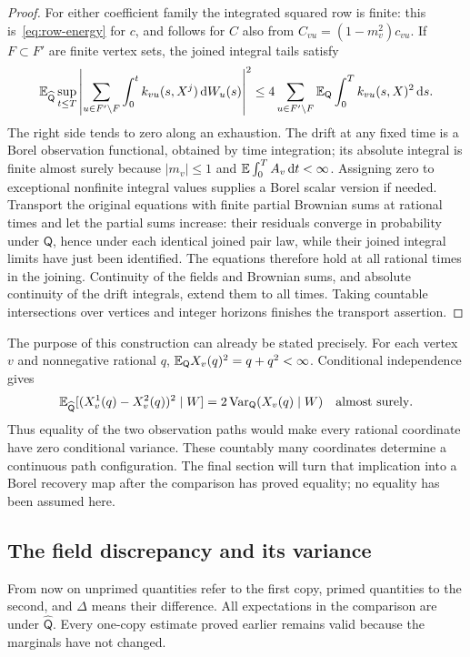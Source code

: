 \begin{proof}
For either coefficient family the integrated squared row is finite:
this is~\eqref{eq:row-energy} for $c$, and follows for $C$ also from
$C_{vu}=(1-m_v^2)c_{vu}$. If $F\subset F'$ are finite vertex sets,
the joined integral tails satisfy
\[
 \mathbb E_{\widehat{\mathsf Q}}\sup_{t\le T}
  \left|\sum_{u\in F'\setminus F}\int_0^t
                k_{vu}(s,X^j)\,\mathrm d W_u(s)\right|^2
 \le4\sum_{u\in F'\setminus F}\mathbb E_{\mathsf Q}
                    \int_0^T k_{vu}(s,X)^2\,\mathrm d s.
\]
The right side tends to zero along an exhaustion. The drift at any
fixed time is a Borel observation functional, obtained by time
integration; its absolute integral is finite almost surely because
$|m_v|\le1$ and $\mathbb E\int_0^T A_v\,\mathrm d t<\infty$. Assigning zero to
exceptional nonfinite integral values supplies a Borel scalar version
if needed. Transport the original equations with finite partial
Brownian sums at rational times and let the partial sums increase:
their residuals converge in probability under $\mathsf Q$, hence
under each identical joined pair law, while their joined integral
limits have just been identified. The equations therefore hold at
all rational times in the joining. Continuity of the fields and
Brownian sums, and absolute continuity of the drift integrals, extend
them to all times. Taking countable intersections over vertices and
integer horizons finishes the transport assertion.
\end{proof}

The purpose of this construction can already be stated precisely.
For each vertex $v$ and nonnegative rational $q$,
$\mathbb E_{\mathsf Q}X_v(q)^2=q+q^2<\infty$. Conditional independence gives
\begin{equation}\label{eq:copy-coordinate-variance}
 \mathbb E_{\widehat{\mathsf Q}}
       [(X^1_v(q)-X^2_v(q))^2\mid W]
   =2\operatorname{Var}_{\mathsf Q}(X_v(q)\mid W)
       \quad\text{almost surely}.
\end{equation}
Thus equality of the two observation paths would make every rational
coordinate have zero conditional variance. These countably many
coordinates determine a continuous path configuration. The final
section will turn that implication into a Borel recovery map after
the comparison has proved equality; no equality has been assumed here.

\subsection{The field discrepancy and its variance}

From now on unprimed quantities refer to the first copy, primed
quantities to the second, and $\Delta$ means their difference. All
expectations in the comparison are under $\widehat{\mathsf Q}$.
Every one-copy estimate proved earlier remains valid because the
marginals have not changed.

